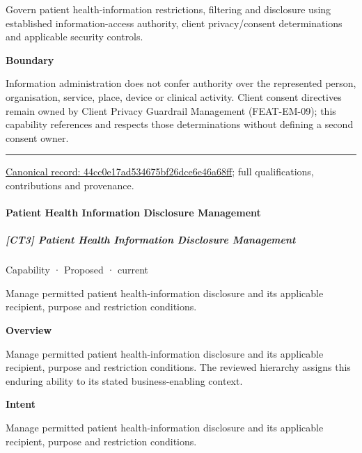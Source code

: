 Govern patient health-information restrictions, filtering and disclosure using established information-access authority, client privacy/consent determinations and applicable security controls.



\textbf{Boundary}



Information administration does not confer authority over the represented person, organisation, service, place, device or clinical activity. Client consent directives remain owned by Client Privacy Guardrail Management (FEAT-EM-09); this capability references and respects those determinations without defining a second consent owner.



\medskip\hrule\medskip

{\footnotesize \href{../../../../continuum/strategy/capability/44cc0e17ad534675bf26dce6e46a68ff.md}{Canonical record: 44cc0e17ad534675bf26dce6e46a68ff}; full qualifications, contributions and provenance.}\par
\paragraph{Patient Health Information Disclosure Management}

\subparagraph{[CT3] Patient Health Information Disclosure Management}

\label{element:7f918639e23842e78fa92f1bf47c5a7b}
{\small Capability · Proposed · current}\par

Manage permitted patient health-information disclosure and its applicable recipient, purpose and restriction conditions.



\textbf{Overview}



Manage permitted patient health-information disclosure and its applicable recipient, purpose and restriction conditions. The reviewed hierarchy assigns this enduring ability to its stated business-enabling context.



\textbf{Intent}



Manage permitted patient health-information disclosure and its applicable recipient, purpose and restriction conditions.



